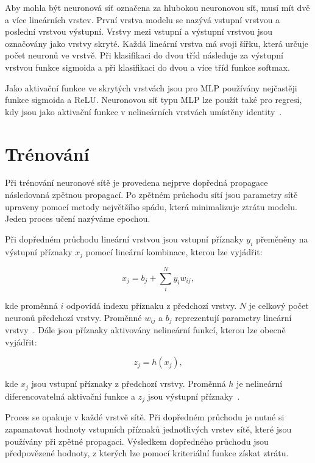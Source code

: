 \documentclass[FM,BP]{tulthesis}
\newcommand{\extend}[1]{\todo[color=green!40]{#1}}
\begin{document}
Aby mohla být neuronová síť označena za hlubokou neuronovou síť, musí mít dvě a více lineárních vrstev. První vrstva modelu se nazývá vstupní vrstvou a poslední vrstvou výstupní. Vrstvy mezi vstupní a výstupní vrstvou jsou označovány jako vrstvy skryté. Každá lineární vrstva má svoji šířku, která určuje počet neuronů ve vrstvě. Při klasifikaci do dvou tříd následuje za výstupní vrstvou funkce sigmoida a při klasifikaci do dvou a více tříd funkce softmax.

Jako aktivační funkce ve skrytých vrstvách jsou pro MLP používány nejčastěji funkce sigmoida a ReLU. Neuronovou síť typu MLP lze použít také pro regresi, kdy jsou jako aktivační funkce v nelineárních vrstvách umístěny identity~\cite{DBLP:books/lib/Bishop07}. \extend{možná ilustrační obrázek sítě?}

\section{Trénování} %
Při trénování neuronové sítě je provedena nejprve dopředná propagace následovaná zpětnou propagací. Po zpětném průchodu sítí jsou parametry sítě upraveny pomocí metody největšího spádu, která minimalizuje ztrátu modelu. Jeden proces učení nazýváme epochou.

Při dopředném průchodu lineární vrstvou jsou vstupní příznaky $ y_i $ přeměněny na výstupní příznaky $ x_j $ pomocí lineární kombinace, kterou lze vyjádřit:

\begin{equation}
\label{eqn:linear_layer}
x_j = b_j + \sum_{i}^{N} y_i w_{ij},
\end{equation}

kde proměnná $ i $ odpovídá indexu příznaku z předchozí vrstvy. $ N $ je celkový počet neuronů předchozí vrstvy. Proměnné $ w_{ij} $ a $ b_j $ reprezentují parametry lineární vrstvy~\cite{MATEJU2021327}. Dále jsou příznaky aktivovány nelineární funkcí, kterou lze obecně vyjádřit:

\begin{equation}
\label{eqn:activation}
z_j = h(x_j),
\end{equation}

kde $ x_j $ jsou vstupní příznaky z předchozí vrstvy. Proměnná $ h $ je nelineární diferencovatelná aktivační funkce a $ z_j $ jsou výstupní příznaky~\cite{DBLP:books/lib/Bishop07}.

Proces se opakuje v každé vrstvě sítě. Při dopředném průchodu je nutné si zapamatovat hodnoty vstupních příznaků jednotlivých vrstev sítě, které jsou používány při zpětné propagaci. Výsledkem dopředného průchodu jsou předpovězené hodnoty, z kterých lze pomocí kriteriální funkce získat ztrátu.
\end{document}
